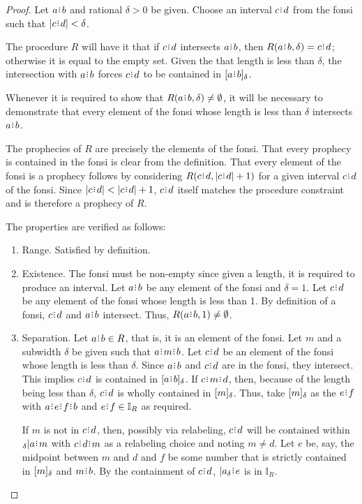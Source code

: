 \documentclass[12pt]{article}
\begin{document}
\begin{proof}
    Let $a\rint b$ and rational $\delta>0$ be given. Choose an interval $c\rint d$ from the fonsi such that $|c\rint d| < \delta$. 

    The procedure $R$ will have it that if $c\rint d$ intersects $a\rint b$, then $R(a\rint b, \delta) = c\rint d$; otherwise it is equal to the empty set. Given the that length is less than $\delta$, the intersection with $a\rint b$ forces $c\rint d$ to be contained in $\halo{a\rint b}$.

    Whenever it is required to show that $R(a\rint b, \delta) \neq \emptyset$, it will be necessary to demonstrate that every element of the fonsi whose length is less than $\delta$ intersects $a\rint b$. 
    
    The prophecies of $R$ are precisely the elements of the fonsi. That every prophecy is contained in the fonsi is clear from the definition. That every element of the fonsi is a prophecy follows by considering $R(c\rint d, |c\rint d|+1)$ for a given interval $c\rint d$ of the fonsi. Since $|c\rint d| < |c\rint d|+1$, $c\rint d$ itself matches the procedure constraint and is therefore a prophecy of $R$. 

    The properties are verified as follows:  
    \begin{enumerate}
        \item Range. Satisfied by definition. 
        \item Existence. The fonsi must be non-empty since given a length, it is required to produce an interval. Let $a\rint b$ be any element of the fonsi and $\delta =1$. Let $c\rint d$ be any element of the fonsi whose length is less than 1. By definition of a fonsi, $c\rint d$ and $a\rint b$ intersect. Thus, $R(a\rint b, 1) 
        \neq \emptyset$.
        \item Separation. 
        Let $a\rint b \in R$, that is, it is an element of the fonsi. Let $m$ and a subwidth $\delta$ be given such that $a\rint m\rint b$. Let $c\rint d$ be an element of the fonsi whose length is less than $\delta$. Since $a\rint b$ and $c\rint d$ are in the fonsi, they intersect. This implies $c\rint d$ is contained in $\halo{a\rint b}$. If $c\rint m\rint d$, then, because of the length being less than $\delta$, $c\rint d$ is wholly contained in $[m]_{\delta}$. Thus, take $[m]_{\delta}$ as the $e\rint f$ with $a\rint e\rint f\rint b$ and $e\rint f \in \mathbb{I}_{R}$ as required. 
        
        If $m$ is not in $c\rint d$, then, possibly via relabeling, $c\rint d$ will be contained within ${}_\delta |a\rint m$ with $c\rint d\rint m$ as a relabeling choice and noting $m \neq d$. Let $e$ be, say, the midpoint between $m$ and $d$ and $f$ be some number that is strictly contained in $[m]_{\delta}$ and $m\rint b$. By the containment of $c\rint d$, $|a_\delta\rint e$ is in $\mathbb{I}_R$.
        

\end{enumerate}
\end{proof}
\end{document}
